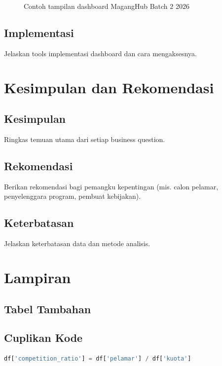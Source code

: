 \documentclass[11pt,a4paper]{report}
\begin{document}
\begin{figure}[H]
\centering
\caption{Contoh tampilan dashboard MagangHub Batch 2 2026}
\label{fig:dashboard}
\end{figure}

\section{Implementasi}
Jelaskan tools implementasi dashboard dan cara mengaksesnya.

\chapter{Kesimpulan dan Rekomendasi}

\section{Kesimpulan}
Ringkas temuan utama dari setiap business question.

\section{Rekomendasi}
Berikan rekomendasi bagi pemangku kepentingan (mis. calon pelamar, penyelenggara program, pembuat kebijakan).

\section{Keterbatasan}
Jelaskan keterbatasan data dan metode analisis.

\printbibliography[title={Daftar Pustaka}]

\appendix
\chapter{Lampiran}

\section{Tabel Tambahan}

\section{Cuplikan Kode}
\begin{lstlisting}[language=Python, caption={Contoh perhitungan competition ratio}]
df['competition_ratio'] = df['pelamar'] / df['kuota']
\end{lstlisting}
\end{document}
